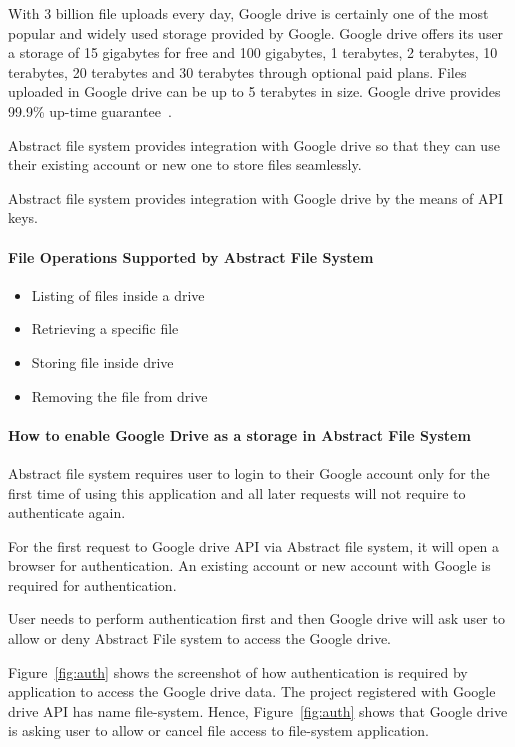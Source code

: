 With 3 billion file uploads every day, Google drive is certainly one of the 
most popular and widely used storage provided by Google. Google drive offers 
its user a storage of 15 gigabytes for free and 100 gigabytes, 1 terabytes, 2 
terabytes, 10 terabytes, 20 terabytes and 30 terabytes through optional paid 
plans. Files uploaded in Google drive can be up to 5 terabytes in size. Google 
drive provides 99.9\% up-time guarantee~\cite{hid-sp18-420-google-drive-wiki}. 

Abstract file system provides integration with Google drive so that they can 
use their existing account or new one to store files seamlessly.

Abstract file system provides integration with Google drive by the means of 
API keys. 

\paragraph{File Operations Supported by Abstract File System}

\begin{itemize}
    \item  Listing of files inside a drive
    \item  Retrieving a specific file 
    \item  Storing file inside drive
    \item  Removing the file from drive
\end{itemize}

\paragraph{How to enable Google Drive as a storage in Abstract File
  System} 

Abstract file system requires user to login to their Google
account only for the first time of using this application and all
later requests will not require to authenticate again.

For the first request to Google drive API via Abstract file system, it
will open a browser for authentication. An existing account or new
account with Google is required for authentication.

User needs to perform authentication first and then Google drive will
ask user to allow or deny Abstract File system to access the Google
drive.

Figure~\ref{fig:auth} shows the screenshot of how authentication is 
required by application to access the Google drive data. 
The project registered with Google drive API has name file-system. 
Hence, Figure~\ref{fig:auth} shows that Google drive is asking user 
to allow or cancel file access to file-system application. 

